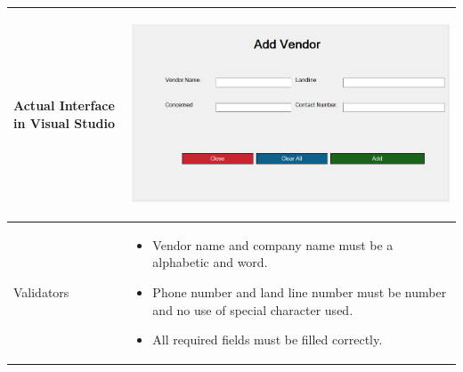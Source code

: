 \documentclass[12pt,a4paper]{article}
\begin{document}
\begin{longtable}{| p{3cm}|p{12cm}|}
Actual Interface in Visual Studio  & \begin{center} \includegraphics[scale=0.3]{./User Interface1/UI-027Add Vendor@1x.png}\end{center}  \\ \hline

Validators & 
\begin{itemize}
\item   Vendor name and company name must be a alphabetic and word.
\item   Phone number and land line number must be number and no use of special character used. 
\item All required fields must be filled correctly. 
\end{itemize}
\\ \hline
\end{longtable}
\end{document}
